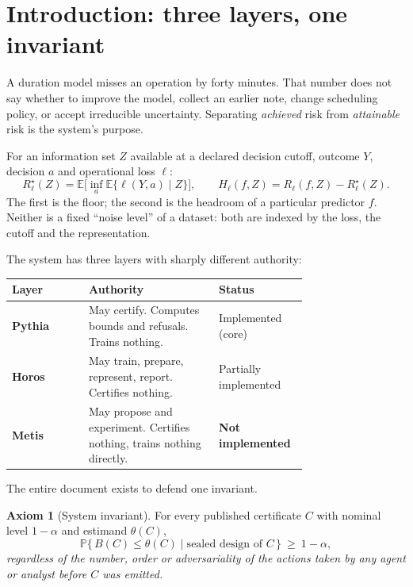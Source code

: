 \documentclass[11pt,a4paper]{article}
\theoremstyle{definition}
\newtheorem{axiom}[theorem]{Axiom}
\theoremstyle{remark}
\newcommand{\risk}{R^{\star}}
\newcommand{\E}{\mathbb{E}}
\newcommand{\Prob}{\mathbb{P}}
\begin{document}
\tableofcontents
\newpage

\section{Introduction: three layers, one invariant}

A duration model misses an operation by forty minutes. That number does not say whether to improve the model, collect an earlier note, change scheduling policy, or accept irreducible uncertainty. Separating \emph{achieved} risk from \emph{attainable} risk is the system's purpose.

For an information set $Z$ available at a declared decision cutoff, outcome $Y$, decision $a$ and operational loss $\ell$:
\begin{equation}
\risk_\ell(Z)=\E\Big[\inf_a \E\{\ell(Y,a)\mid Z\}\Big],
\qquad
H_\ell(f,Z)=R_\ell(f,Z)-\risk_\ell(Z).
\label{eq:floorhead}
\end{equation}
The first is the floor; the second is the headroom of a particular predictor $f$. Neither is a fixed ``noise level'' of a dataset: both are indexed by the loss, the cutoff and the representation.

The system has three layers with sharply different authority:

\begin{center}
\begin{tabular}{@{}lp{0.44\linewidth}p{0.3\linewidth}@{}}
\toprule
Layer & Authority & Status \\
\midrule
\textbf{Pythia} & May certify. Computes bounds and refusals. Trains nothing. & Implemented (core) \\
\textbf{Horos} & May train, prepare, represent, report. Certifies nothing. & Partially implemented \\
\textbf{Metis} & May propose and experiment. Certifies nothing, trains nothing directly. & \textbf{Not implemented} \\
\bottomrule
\end{tabular}
\end{center}

The entire document exists to defend one invariant.

\begin{axiom}[System invariant]\label{ax:inv}
For every published certificate $C$ with nominal level $1-\alpha$ and estimand $\theta(C)$,
\[
\Prob\big\{\,B(C)\le\theta(C)\;\big|\;\text{sealed design of }C\,\big\}\ \ge\ 1-\alpha,
\]
\emph{regardless of the number, order or adversariality of the actions taken by any agent or analyst before $C$ was emitted.}
\end{axiom}
\end{document}
